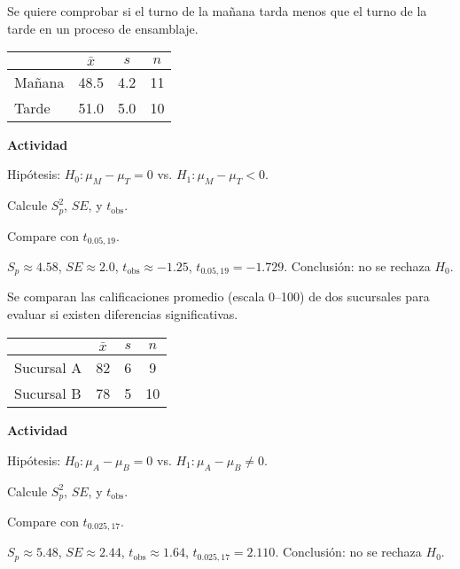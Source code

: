\begin{ejercicio}
Se quiere comprobar si el turno de la mañana tarda menos que el turno de la tarde en un proceso de ensamblaje.

\begin{center}
\begin{tabular}{@{}lccc@{}}
\toprule
 & $\bar{x}$ & $s$ & $n$ \\
\midrule
Mañana & 48.5 & 4.2 & 11 \\
Tarde & 51.0 & 5.0 & 10 \\
\bottomrule
\end{tabular}
\end{center}

\textbf{Actividad}
\begin{pasos}
  \item Hipótesis: $H_0:\mu_M-\mu_T=0$ vs. $H_1:\mu_M-\mu_T<0$.
  \item Calcule $S_p^2$, $SE$, y $t_{\text{obs}}$.
  \item Compare con $t_{0.05,19}$.
\end{pasos}

\begin{clave}
$S_p\approx4.58$, $SE\approx2.0$, $t_{\text{obs}}\approx-1.25$, $t_{0.05,19}=-1.729$.
Conclusión: no se rechaza $H_0$.
\end{clave}
\end{ejercicio}

\begin{ejercicio}
Se comparan las calificaciones promedio (escala 0--100) de dos sucursales para evaluar si existen diferencias significativas.

\begin{center}
\begin{tabular}{@{}lccc@{}}
\toprule
 & $\bar{x}$ & $s$ & $n$ \\
\midrule
Sucursal A & 82 & 6 & 9 \\
Sucursal B & 78 & 5 & 10 \\
\bottomrule
\end{tabular}
\end{center}

\textbf{Actividad}
\begin{pasos}
  \item Hipótesis: $H_0:\mu_A-\mu_B=0$ vs. $H_1:\mu_A-\mu_B\neq0$.
  \item Calcule $S_p^2$, $SE$, y $t_{\text{obs}}$.
  \item Compare con $t_{0.025,17}$.
\end{pasos}

\begin{clave}
$S_p\approx5.48$, $SE\approx2.44$, $t_{\text{obs}}\approx1.64$, $t_{0.025,17}=2.110$.
Conclusión: no se rechaza $H_0$.
\end{clave}
\end{ejercicio}

